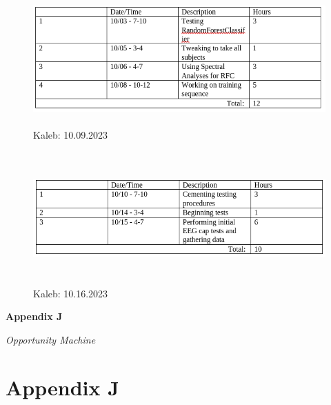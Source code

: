 \documentclass[conference]{IEEEtran}
\begin{document}
    \begin{figure}[htbp]
                \centerline{\includegraphics[height=2in,keepaspectratio]{figs/I/K_10.09.2023.png}}
                \caption{Kaleb: 10.09.2023}
                \label{Fig:K_10.09.2023}
    \end{figure} 
    \begin{figure}[htbp]
                \centerline{\includegraphics[height=2in,keepaspectratio]{figs/I/K_10.16.2023.png}}
                \caption{Kaleb: 10.16.2023}
                \label{Fig:K_10.16.2023}
    \end{figure}

\clearpage
\onecolumn
\begin{center}
    \vspace*{5cm}
     {\Huge\bfseries Appendix J \par}
     \vspace{1cm}
    \textit{Opportunity Machine} \\
\end{center}

\setcounter{section}{10}
\renewcommand{\thesubsection}{J.\Alph{subsection}}
\section*{\textbf{Appendix J}}
        \setcounter{figure}{0}
        \renewcommand{\thefigure}{J.\arabic{figure}}
        \setcounter{table}{0}
        \renewcommand{\thetable}{J.\arabic{table}}
        \setcounter{subsection}{0}


\end{document}

